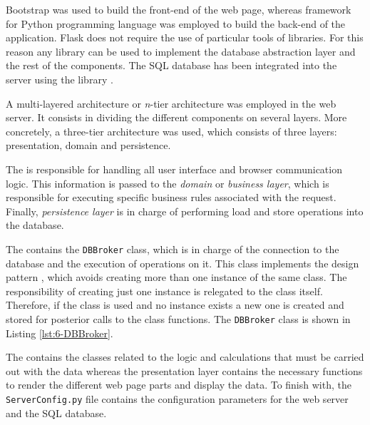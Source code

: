 Bootstrap was used to build the front-end of the web page, whereas  framework \cite{Gri14} for Python programming language was employed to build the back-end of the application. Flask does not require the use of particular tools of libraries. For this reason any library can be used to implement the database abstraction layer and the rest of the components. The SQL database has been integrated into the server using the library  \cite{Mat16}. 

A multi-layered architecture or \textit{n}-tier architecture was employed in the web server. It consists in dividing the different components on several layers. More concretely, a three-tier architecture was used, which consists of three layers: presentation, domain and persistence.

The  is responsible for handling all user interface and browser communication logic. This information is passed to the \textit{domain} or \textit{business layer}, which is responsible for executing specific business rules associated with the request. Finally, \textit{persistence layer} is in charge of performing load and store operations into the database.


The  contains the \texttt{DBBroker} class, which is in charge of the connection to the database and the execution of operations on it. This class implements the  design pattern \cite{design_patterns, Vil07}, which avoids creating more than one instance of the same class. The responsibility of creating just one instance is relegated to the class itself. Therefore, if the class is used and no instance exists a new one is created and stored for posterior calls to the class functions. The \texttt{DBBroker} class is shown in Listing \ref{lst:6-DBBroker}.

The  contains the classes related to the logic and calculations that must be carried out with the data whereas the presentation layer contains the necessary functions to render the different web page parts and display the data. To finish with, the \texttt{ServerConfig.py} file contains the configuration parameters for the web server and the SQL database.




